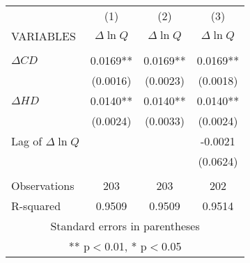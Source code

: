 \begin{tabular}{lccc} \hline
 & (1) & (2) & (3) \\
VARIABLES & $\Delta \ln Q$ & $\Delta \ln Q$ & $\Delta \ln Q$ \\ \hline
 &  &  &  \\
$\Delta CD$ & 0.0169** & 0.0169** & 0.0169** \\
 & (0.0016) & (0.0023) & (0.0018) \\
$\Delta HD$ & 0.0140** & 0.0140** & 0.0140** \\
 & (0.0024) & (0.0033) & (0.0024) \\
Lag of $\Delta \ln Q$ &  &  & -0.0021 \\
 &  &  & (0.0624) \\
 &  &  &  \\
Observations & 203 & 203 & 202 \\
 R-squared & 0.9509 & 0.9509 & 0.9514 \\ \hline
\multicolumn{4}{c}{ Standard errors in parentheses} \\
\multicolumn{4}{c}{ ** p$<$0.01, * p$<$0.05} \\
\end{tabular}
